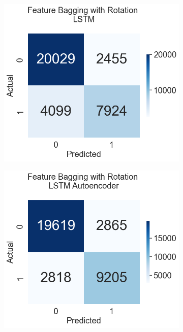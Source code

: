 \documentclass[a4paper,12pt]{report}
\theoremstyle{definitionNODot}
\begin{document}
\begin{figure}[H]
\begin{subfigure}[b]{0.35\textwidth}
			\label{fig:anomaly_by_ensemble_ensemble_rotation_conv_ae}
		\end{subfigure}
		\medskip
		\begin{subfigure}[b]{0.35\textwidth}
			\centering
			\includegraphics[width=\textwidth]{anomaly_by_ensemble_ensemble_rotation_lstm.png}
			
			\label{fig:anomaly_by_ensemble_ensemble_rotation_lstm}
		\end{subfigure}
		\hfil
		\begin{subfigure}[b]{0.35\textwidth}
			\centering
			\includegraphics[width=\textwidth]{anomaly_by_ensemble_ensemble_rotation_lstm_ae.png}
			

\end{subfigure}
\end{figure}
\end{document}
